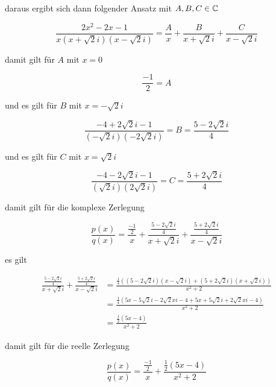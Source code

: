 \documentclass[a4paper, 11pt]{article}
\begin{document}
daraus ergibt sich dann folgender Ansatz mit \(A, B, C \in \mathbb{C}\)

$$ \frac{2x^2 - 2x - 1}{x(x + \sqrt{2}i)(x - \sqrt{2}i)} = \frac{A}{x} +
    \frac{B}{x + \sqrt{2}i} + \frac{C}{x - \sqrt{2}i} $$

\pagebreak

damit gilt für \(A\) mit \(x = 0\)

$$ \frac{-1}{2} = A $$

und es gilt für \(B\) mit \(x = -\sqrt{2}i\)

$$ \frac{-4 + 2\sqrt{2}i - 1}{(-\sqrt{2}i)(-2\sqrt{2}i)} = B = \frac{5 - 2\sqrt{2}i}{4} $$

und es gilt für \(C\) mit \(x = \sqrt{2}i\)

$$ \frac{-4 - 2\sqrt{2}i - 1}{(\sqrt{2}i)(2\sqrt{2}i)} = C = \frac{5 + 2\sqrt{2}i}{4} $$

damit gilt für die komplexe Zerlegung

$$ \frac{p(x)}{q(x)} = \frac{\frac{-1}{2}}{x} + \frac{\frac{5 - 2\sqrt{2}i}{4}}{x + \sqrt{2}i} +
    \frac{\frac{5 + 2\sqrt{2}i}{4}}{x - \sqrt{2}i} $$

es gilt

\begin{align*}
    \frac{\frac{5 - 2\sqrt{2}i}{4}}{x + \sqrt{2}i} + \frac{\frac{5 + 2\sqrt{2}i}{4}}{x - \sqrt{2}i} &=
        \frac{\frac{1}{4}((5 - 2\sqrt{2}i)(x - \sqrt{2}i) + (5 + 2\sqrt{2}i)(x + \sqrt{2}i))}{x^2 + 2} \\
    &= \frac{\frac{1}{4}(5x - 5\sqrt{2}i - 2\sqrt{2}xi - 4 + 5x + 5\sqrt{2}i + 2\sqrt{2}xi - 4)}{x^2 + 2} \\
    &= \frac{\frac{1}{2}(5x - 4)}{x^2 + 2}
\end{align*}

damit gilt für die reelle Zerlegung

$$ \frac{p(x)}{q(x)} = \frac{\frac{-1}{2}}{x} + \frac{\frac{1}{2}(5x - 4)}{x^2 + 2} $$
\end{document}
